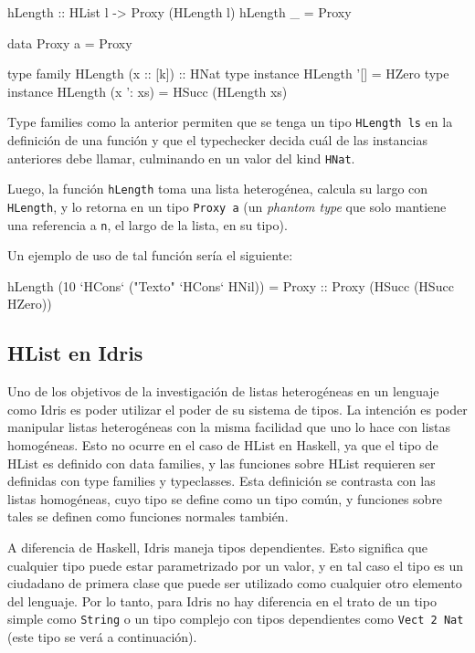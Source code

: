 \begin{code}
hLength :: HList l -> Proxy (HLength l)
hLength _ = Proxy

data Proxy a = Proxy

type family HLength (x :: [k]) :: HNat
type instance HLength '[] = HZero
type instance HLength (x ': xs) = HSucc (HLength xs)
\end{code}

Type families como la anterior permiten que se tenga un tipo \texttt{HLength ls} en la definición de una función y que el typechecker decida cuál de las instancias anteriores debe llamar, culminando en un valor del kind \texttt{HNat}.

Luego, la función \texttt{hLength} toma una lista heterogénea, calcula su largo con \texttt{HLength}, y lo retorna en un tipo \texttt{Proxy a} (un \textit{phantom type} que solo mantiene una referencia a \texttt{n}, el largo de la lista, en su tipo).

Un ejemplo de uso de tal función sería el siguiente:

\begin{code}
hLength (10 `HCons` ("Texto" `HCons` HNil)) = 
  Proxy :: Proxy (HSucc (HSucc HZero))
\end{code}

\subsection{HList en Idris}

Uno de los objetivos de la investigación de listas heterogéneas en un lenguaje como Idris es poder utilizar el poder de su sistema de tipos. La intención es poder manipular listas heterogéneas con la misma facilidad que uno lo hace con listas homogéneas. Esto no ocurre en el caso de HList en Haskell, ya que el tipo de HList es definido con data families, y las funciones sobre HList requieren ser definidas con type families y typeclasses. Esta definición se contrasta con las listas homogéneas, cuyo tipo se define como un tipo común, y funciones sobre tales se definen como funciones normales también.

A diferencia de Haskell, Idris maneja tipos dependientes. Esto significa que cualquier tipo puede estar parametrizado por un valor, y en tal caso el tipo es un ciudadano de primera clase que puede ser utilizado como cualquier otro elemento del lenguaje. Por lo tanto, para Idris no hay diferencia en el trato de un tipo simple como \texttt{String} o un tipo complejo con tipos dependientes como \texttt{Vect 2 Nat} (este tipo se verá a continuación).


